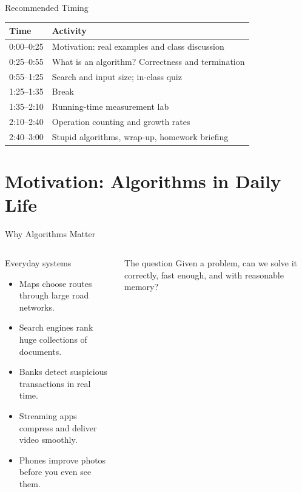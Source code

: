 \documentclass[aspectratio=169,xcolor=dvipsnames]{beamer}
\begin{document}
\begin{frame}{Recommended Timing}
  \begin{table}
    \centering
    \begin{tabular}{ll}
      \toprule
      Time & Activity \\
      \midrule
      0:00--0:25 & Motivation: real examples and class discussion \\
      0:25--0:55 & What is an algorithm? Correctness and termination \\
      0:55--1:25 & Search and input size; in-class quiz \\
      1:25--1:35 & Break \\
      1:35--2:10 & Running-time measurement lab \\
      2:10--2:40 & Operation counting and growth rates \\
      2:40--3:00 & Stupid algorithms, wrap-up, homework briefing \\
      \bottomrule
    \end{tabular}
  \end{table}
\end{frame}

\section{Motivation: Algorithms in Daily Life}

\begin{frame}{Why Algorithms Matter}
  \begin{columns}
    \begin{block}{Everyday systems}
      \begin{itemize}
        \item Maps choose routes through large road networks.
        \item Search engines rank huge collections of documents.
        \item Banks detect suspicious transactions in real time.
        \item Streaming apps compress and deliver video smoothly.
        \item Phones improve photos before you even see them.
      \end{itemize}
    \end{block}
    \begin{alertblock}{The question}
      Given a problem, can we solve it correctly, fast enough, and with reasonable memory?
    \end{alertblock}
  \end{columns}
\end{frame}
\end{document}
